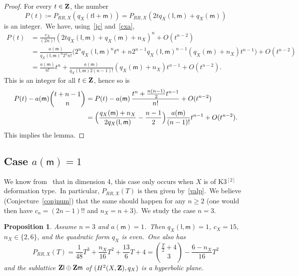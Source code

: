 \documentclass[12pt]{amsart}
\def\Z{{\bf Z}}
\def\hKm{hyper-K\"ahler manifold}
\newtheorem{prop}[lemm]{Proposition}
\theoremstyle{remark}
\def\lll{\ensuremath{\mathsf l}}
\def\mm{\ensuremath{\mathsf m}}
\begin{document}
\begin{proof}
For every $t\in\Z$, the number
$$P(t )\coloneqq P_{RR,X}(q_X(t\lll+\mm))=P_{RR,X}(2tq_X(\lll,\mm)+q_X(\mm))
$$
is an integer.\ We have, using~\eqref{jc} and~\eqref{cxa},
   \begin{align*}\label{jc3}
P(t)&=\frac{c_X}{(2n)!} (2tq_X(\lll,\mm)+q_X(\mm)+n_X)^n +O(t^{n-2})\\
&= \frac{a(\mm) }{q_X(\lll,\mm)^n2^nn!} (2^n q_X(\lll,\mm)^nt^n+ n2^{n-1} q_X(\lll,\mm)^{n-1}(q_X(\mm)+n_X)t^{n-1}\bigr)  +O(t^{n-2})\\
&= \frac{a(\mm)}{  n!}    t^n+  \frac{a(\mm)}{q_X(\lll,\mm) 2 (n-1)!}    (q_X(\mm)+n_X)t^{n-1}  +O(t^{n-2}).
\end{align*}
This is an integer for all $t\in\Z$, hence so is
   \begin{align*} 
P(t)-a(\mm)\binom{t+n-1}{n}&=P(t)- a(\mm)\, \frac{ t^n+\frac{n(n-1)}2 t^{n-1}}{  n!}    +O(t^{n-2})\\
&= \Bigl( \frac{q_X(\mm)+n_X}{2q_X(\lll,\mm)  }-\frac{n-1}2   \Bigr)    \frac{a(\mm)}{ (n-1)!}  t^{n-1}   +O(t^{n-2}) .
\end{align*}
This implies the lemma.
\end{proof}

\subsection{Case  $a(\mm)=1$}  We know from~\cite[Theorem~1.5]{dhmv}
that in dimension 4, this case only  occurs when $X$ is of K3$^{[2]}$ deformation type.\ In particular, $P_{RR,X}(T)$ is then given by~\eqref{valp}.\ We believe (Conjecture~\ref{conjnum}) that the same should happen for any $n\ge2 $ (one would then have   $c_n=(2n-1)!!$ and $n_X=n+3$).\ We study the case $n=3$.


\begin{prop}\label{prop43}
Assume $n=3$ and $a(\mm)=1$.\ Then
$q_X(\lll,\mm)=1$, $c_X=15$, $n_X \in\{2,6 \}$, and the quadratic form $q_X$ is even.\ One also has 
$$P_{RR,X}(T)=
  \frac{1}{48}T^3+\frac{n_X}{16}T^2+
  \frac{13}6T+4
  = \binom{\frac{T}{2}+4}{3}-\frac{6-n_X}{16}T^2$$
and the sublattice $\Z\lll\oplus \Z\mm$ of $(H^2(X,\Z),q_X)$ is  a hyperbolic plane.
\end{prop}
\end{document}
